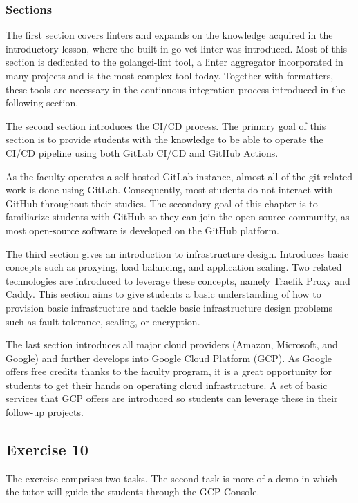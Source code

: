 \documentclass[
  digital,
  color,
  oneside,
  nosansbold,
  nocolorbold,
  lof,
  lot,
]{fithesis4}
\begin{document}
\subsubsection{Sections}

The first section covers linters and expands on the knowledge acquired in the introductory lesson, where the built-in go-vet linter was introduced. Most of this section is dedicated to the golangci-lint tool, a linter aggregator incorporated in many projects and is the most complex tool today. Together with formatters, these tools are necessary in the continuous integration process introduced in the following section.

The second section introduces the CI/CD process. The primary goal of this section is to provide students with the knowledge to be able to operate the CI/CD pipeline using both GitLab CI/CD and GitHub Actions.

As the faculty operates a self-hosted GitLab instance, almost all of the git-related work is done using GitLab. Consequently, most students do not interact with GitHub throughout their studies. The secondary goal of this chapter is to familiarize students with GitHub so they can join the open-source community, as most open-source software is developed on the GitHub platform.

The third section gives an introduction to infrastructure design. Introduces basic concepts such as proxying, load balancing, and application scaling. Two related technologies are introduced to leverage these concepts, namely Traefik Proxy and Caddy. This section aims to give students a basic understanding of how to provision basic infrastructure and tackle basic infrastructure design problems such as fault tolerance, scaling, or encryption.

The last section introduces all major cloud providers (Amazon, Microsoft, and Google) and further develops into Google Cloud Platform (GCP). As Google offers free credits thanks to the faculty program, it is a great opportunity for students to get their hands on operating cloud infrastructure. A set of basic services that GCP offers are introduced so students can leverage these in their follow-up projects.

\subsection{Exercise 10}

The exercise comprises two tasks. The second task is more of a demo in which the tutor will guide the students through the GCP Console.
\end{document}
